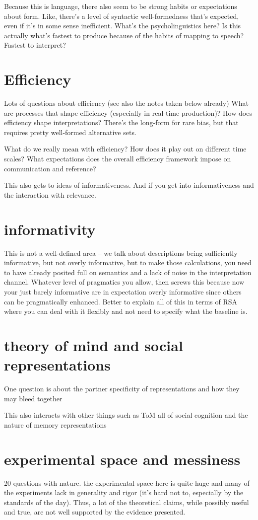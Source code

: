 \documentclass[]{article}
\begin{document}
Because this is language, there also seem to be strong habits or expectations about form. Like, there's a level of syntactic well-formedness that's expected, even if it's in some sense inefficient. What's the psycholinguistics here? Is this actually what's fastest to produce because of the habits of mapping to speech? Fastest to interpret? 

\section{Efficiency}
Lots of questions about efficiency (see also the notes taken below already)
What are processes that shape efficiency (especially in real-time production)? How does efficiency shape interpretations? There's the long-form for rare bias, but that requires pretty well-formed alternative sets. 

What do we really mean with efficiency? How does it play out on different time scales? What expectations does the overall efficiency framework impose on communication and reference? 

This also gets to ideas of informativeness. And if you get into informativeness and the interaction with relevance. 


\section{informativity}
This is not a well-defined area -- we talk about descriptions being sufficiently informative, but not overly informative, but to make those calculations, you need to have already posited full on semantics and a lack of noise in the interpretation channel. Whatever level of pragmatics you allow, then screws this because now your just barely informative are in expectation overly informative since others can be pragmatically enhanced. Better to explain all of this in terms of RSA where you can deal with it flexibly and not need to specify what the baseline is. 

\section{theory of mind and social representations}
One question is about the partner specificity of representations and how they may bleed together

This also interacts with other things such as ToM all of social cognition and the nature of memory representations 

\section{experimental space and messiness}
20 	questions with nature. 
the experimental space here is quite huge and many of the experiments lack in generality and rigor (it's hard not to, especially by the standards of the day). Thus, a lot of the theoretical claims, while possibly useful and true, are not well supported by the evidence presented. 
\end{document}
